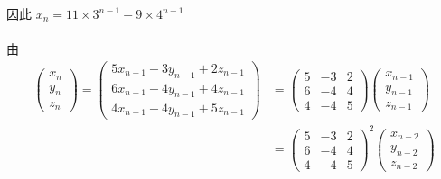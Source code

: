 		 因此 \( x_{n} = 11\times3^{n-1}-9\times4^{n-1} \)


	 \paragraph{} %
		 由
		 \begin{align*}
			 \begin{pmatrix}
				 x_{n} \\
				 y_{n} \\
				 z_{n}
			 \end{pmatrix} = \begin{pmatrix}
				                 5x_{n-1} - 3y_{n-1} + 2z_{n-1} \\
				                 6x_{n-1} - 4y_{n-1} + 4z_{n-1} \\
				                 4x_{n-1} - 4y_{n-1} + 5z_{n-1}
			                 \end{pmatrix} & = \begin{pmatrix}
				                                   5 & -3 & 2 \\
				                                   6 & -4 & 4 \\
				                                   4 & -4 & 5
			                                   \end{pmatrix}\begin{pmatrix}
				                                                x_{n-1} \\
				                                                y_{n-1} \\
				                                                z_{n-1}
			                                                \end{pmatrix}           \\
			                                   & = \begin{pmatrix}
				                                       5 & -3 & 2 \\
				                                       6 & -4 & 4 \\
				                                       4 & -4 & 5
			                                       \end{pmatrix}^{2}\begin{pmatrix}
				                                                        x_{n-2} \\
				                                                        y_{n-2} \\
				                                                        z_{n-2}

\end{pmatrix}
\end{align*}
